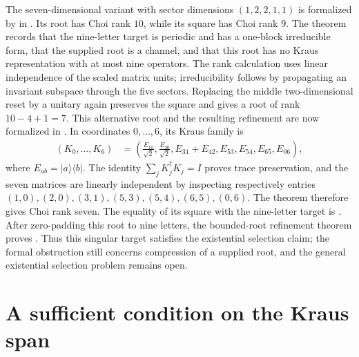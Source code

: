 \documentclass{article}
\begin{document}
The seven-dimensional variant with sector dimensions $(1,2,2,1,1)$ is
formalized by
 in
.
Its root has Choi rank $10$, while its square has Choi rank $9$.
The theorem records that the nine-letter target is periodic and has a
one-block irreducible form, that the supplied root is a channel, and that
this root has no Kraus representation with at most nine operators.
The rank calculation uses linear independence of the scaled matrix units;
irreducibility follows by propagating an invariant subspace through the
five sectors. Replacing the middle two-dimensional reset by a unitary
again preserves the square and gives a root of rank $10-4+1=7$.
This alternative root and the resulting refinement are now formalized in
.
In coordinates $0,\ldots,6$, its Kraus family is
\begin{align}
 (K_0,\ldots,K_6)&=
 \left(\frac{E_{10}}{\sqrt2},\frac{E_{20}}{\sqrt2},
 E_{31}+E_{42},E_{53},E_{54},E_{65},E_{06}\right),
 \label{eq:dccsp17_cyclic_alternative_root}
\end{align}
where $E_{ab}=|a\rangle\langle b|$. The identity
$\sum_jK_j^\dagger K_j=I$ proves trace preservation, and the seven
matrices are linearly independent by inspecting respectively entries
$(1,0),(2,0),(3,1),(5,3),(5,4),(6,5),(0,6)$.
The theorem 
therefore gives Choi rank seven. The equality of its square with the
nine-letter target is
.
After zero-padding this root to nine letters, the bounded-root refinement
theorem proves
.
Thus this singular target satisfies the existential selection claim;
the formal obstruction still concerns compression of a supplied root,
and the general existential selection problem remains open.

\section{A sufficient condition on the Kraus span}
\end{document}
